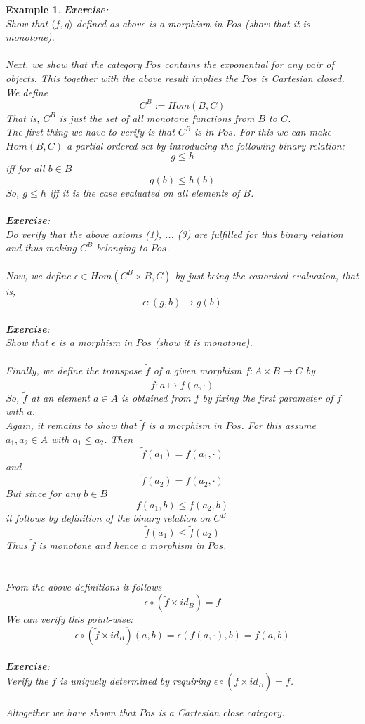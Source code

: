 \documentclass[17pt]{extarticle}
\newtheorem*{example*}{Example}
\begin{document}
\begin{example*}
	\textbf{Exercise}:\\
	Show that $\langle f,g\rangle$ defined as above is a morphism in $Pos$ (show that it is monotone).\\ \\
	
	Next, we show that the category $Pos$ contains the exponential for any pair of objects. This together with the above result implies the $Pos$ is Cartesian closed.\\
	
	We define
	$$C^B:=Hom(B,C)$$
	That is, $C^B$ is just the set of all monotone functions from $B$ to $C$.\\
    The first thing we have to verify is that $C^B$ is in $Pos$. For this we can make $Hom(B,C)$ a partial ordered set by introducing the following binary relation:
    $$g\leq h$$
    iff for all $b\in B$
    $$g(b)\leq h(b)$$
    So, $g\leq h$ iff it is the case evaluated on all elements of $B$.\\ \\
    
    \textbf{Exercise}:\\
    Do verify that the above axioms (1), ... (3) are fulfilled for this binary relation and thus making $C^B$ belonging to $Pos$.\\ \\
    
    Now, we define $\epsilon\in Hom(C^B\times B, C)$ by just being the canonical evaluation, that is,
    $$\epsilon:(g, b)\mapsto g(b)$$\\    
    \textbf{Exercise}:\\
    Show that $\epsilon$ is a morphism in $Pos$ (show it is monotone).\\ \\
	Finally, we define the transpose $\tilde{f}$ of a given morphism $f:A\times B\rightarrow C$ by
	$$\tilde{f}:a\mapsto f(a, \cdot)$$    
	So, $\tilde{f}$ at an element $a\in A$ is obtained from $f$ by fixing the first parameter of $f$ with $a$.\\
	Again, it remains to show that $\tilde{f}$ is a morphism in $Pos$. For this assume $a_1, a_2\in A$ with $a_1\leq a_2$. Then 
	$$\tilde{f}(a_1)=f(a_1, \cdot)$$
	and
	$$\tilde{f}(a_2)=f(a_2, \cdot)$$
	But since for any $b\in B$
	$$f(a_1, b)\leq f(a_2, b)$$
	it follows by definition of the binary relation on $C^B$
	$$\tilde{f}(a_1)\leq \tilde{f}(a_2)$$
	Thus $\tilde{f}$ is monotone and hence a morphism in $Pos$.\\ \\ \\
	From the above definitions it follows
	$$\epsilon\circ (\tilde{f}\times id_B)=f$$
	We can verify this point-wise:
	$$\epsilon\circ (\tilde{f}\times id_B)(a,b)=\epsilon(f(a,\cdot), b)=f(a,b)$$\\
	\textbf{Exercise}:\\
	Verify the $\tilde{f}$ is uniquely determined by requiring $\epsilon\circ (\tilde{f}\times id_B)=f$.\\ \\
	Altogether we have shown that $Pos$ is a Cartesian close category.
\end{example*}
\end{document}
